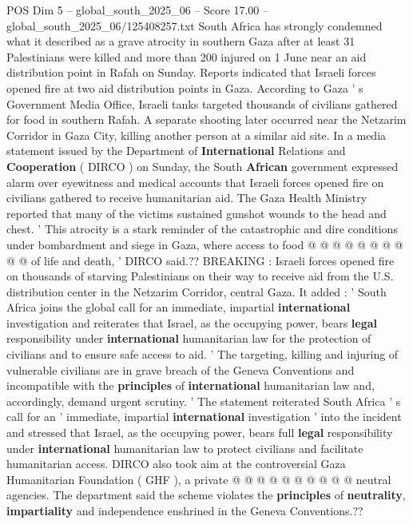 \begin{textsample}{POS Dim 5 – global\_south\_2025\_06 – Score 17.00 – global\_south\_2025\_06/125408257.txt}  \label{ex:f5_pos_056}
South Africa has strongly condemned what it described as a grave atrocity in southern Gaza after at least 31 Palestinians were killed and more than 200 injured on 1 June near an aid distribution point in Rafah on Sunday.
Reports indicated that Israeli forces opened fire at two aid distribution points in Gaza.
According to Gaza ' s Government Media Office, Israeli tanks targeted thousands of civilians gathered for food in southern Rafah.
A separate shooting later occurred near the Netzarim Corridor in Gaza City, killing another person at a similar aid site.
In a media statement issued by the Department of \textbf{International} Relations and \textbf{Cooperation} ( DIRCO ) on Sunday, the South \textbf{African} government expressed alarm over eyewitness and medical accounts that Israeli forces opened fire on civilians gathered to receive humanitarian aid.
The Gaza Health Ministry reported that many of the victims sustained gunshot wounds to the head and chest. ' This atrocity is a stark reminder of the catastrophic and dire conditions under bombardment and siege in Gaza, where access to food @ @ @ @ @ @ @ @ @ @ of life and death, ' DIRCO said.??
BREAKING : Israeli forces opened fire on thousands of starving Palestinians on their way to receive aid from the U.S. distribution center in the Netzarim Corridor, central Gaza.
It added : ' South Africa joins the global call for an immediate, impartial \textbf{international} investigation and reiterates that Israel, as the occupying power, bears \textbf{legal} responsibility under \textbf{international} humanitarian law for the protection of civilians and to ensure safe access to aid. ' The targeting, killing and injuring of vulnerable civilians are in grave breach of the Geneva Conventions and incompatible with the \textbf{principles} of \textbf{international} humanitarian law and, accordingly, demand urgent scrutiny. ' The statement reiterated South Africa ' s call for an ' immediate, impartial \textbf{international} investigation ' into the incident and stressed that Israel, as the occupying power, bears full \textbf{legal} responsibility under \textbf{international} humanitarian law to protect civilians and facilitate humanitarian access.
DIRCO also took aim at the controversial Gaza Humanitarian Foundation ( GHF ), a private @ @ @ @ @ @ @ @ @ @ neutral agencies.
The department said the scheme violates the \textbf{principles} of \textbf{neutrality}, \textbf{impartiality} and independence enshrined in the Geneva Conventions.??

\end{textsample}
